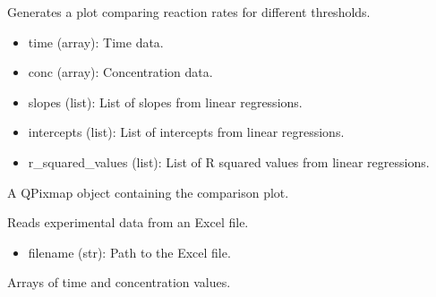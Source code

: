 \documentclass[a4paper,10pt,english]{sphinxmanual}
\begin{document}
\begin{fulllineitems}
\label{\detokenize{utils:src.utils.initial_rate.plot_rate_comparison}}
\pysigstartsignatures
{}
\pysigstopsignatures
\sphinxAtStartPar
Generates a plot comparing reaction rates for different thresholds.
\begin{description}
\begin{itemize}
\item {} 
\sphinxAtStartPar
time (array): Time data.

\item {} 
\sphinxAtStartPar
conc (array): Concentration data.

\item {} 
\sphinxAtStartPar
slopes (list): List of slopes from linear regressions.

\item {} 
\sphinxAtStartPar
intercepts (list): List of intercepts from linear regressions.

\item {} 
\sphinxAtStartPar
r\_squared\_values (list): List of R squared values from linear regressions.

\end{itemize}

\sphinxAtStartPar
A QPixmap object containing the comparison plot.

\end{description}

\end{fulllineitems}


\begin{fulllineitems}
\label{\detokenize{utils:src.utils.initial_rate.read_data}}
\pysigstartsignatures
{}
\pysigstopsignatures
\sphinxAtStartPar
Reads experimental data from an Excel file.
\begin{description}
\begin{itemize}
\item {} 
\sphinxAtStartPar
filename (str): Path to the Excel file.

\end{itemize}

\sphinxAtStartPar
Arrays of time and concentration values.

\end{description}

\end{fulllineitems}
\end{document}
